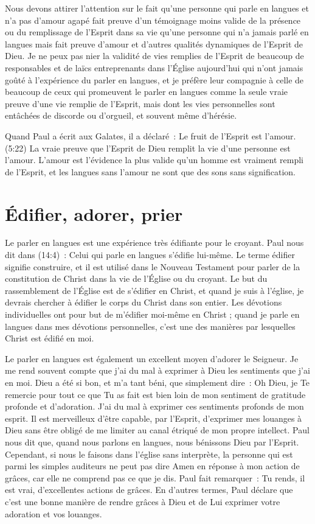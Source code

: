 Nous devons attirer l'attention sur le fait qu'une personne qui parle
 en langues et n'a pas d'amour agapé fait preuve d'un témoignage
 moins valide de la présence ou du remplissage de l'Esprit dans sa vie
 qu'une personne qui n'a jamais parlé en langues mais fait preuve d'amour
 et d'autres qualités dynamiques de l'Esprit de Dieu.
 Je ne peux pas nier la validité de vies remplies de l'Esprit de beaucoup
 de responsables et de laïcs entreprenants dans l'Église aujourd'hui
 qui n'ont jamais goûté à l'expérience du parler en langues,
 et je préfère leur compagnie à celle de beaucoup de ceux qui promeuvent
 le parler en langues comme la seule vraie preuve d'une vie remplie
 de l'Esprit, mais dont les vies personnelles sont entâchées de discorde
 ou d'orgueil, et souvent même d'hérésie.

Quand Paul a écrit aux Galates, il a déclaré~:
 \og Le fruit de l'Esprit est l'amour. \fg{}(5:22)
 La vraie preuve que l'Esprit de Dieu remplit la vie d'une personne
 est l'amour. L'amour est l'évidence la plus valide qu'un homme
 est vraiment rempli de l'Esprit, et les langues sans l'amour
 ne sont que des sons sans signification.


\section{\'Edifier, adorer, prier}

Le parler en langues est une expérience très édifiante pour le croyant.
 Paul nous dit dans (14:4)~:
 \og Celui qui parle en langues s'édifie lui-même. \fg{}
 Le terme \og édifier \fg{} signifie construire, et il est utilisé
 dans le Nouveau Testament pour parler de la constitution de Christ
 dans la vie de l'Église ou du croyant. Le but du rassemblement de l'Église
 est de s'édifier en Christ, et quand je suis à l'église,
 je devrais chercher à édifier le corps du Christ dans son entier.
 Les dévotions individuelles ont pour but de m'édifier moi-même en Christ ;
 quand je parle en langues dans mes dévotions personnelles,
 c'est une des manières par lesquelles Christ est édifié en moi.

Le parler en langues est également un excellent moyen d'adorer le Seigneur.
 Je me rend souvent compte que j'ai du mal à exprimer à Dieu les sentiments
 que j'ai en moi. Dieu a été si bon, et m'a tant béni, que simplement dire~:
 \og Oh Dieu, je Te remercie pour tout ce que Tu as fait \fg{}
 est bien loin de mon sentiment de gratitude profonde et d'adoration.
 J'ai du mal à exprimer ces sentiments profonds de mon esprit.
 Il est merveilleux d'être capable, par l'Esprit, d'exprimer mes louanges
 à Dieu sans être obligé de me limiter au canal étriqué
 de mon propre intellect. Paul nous dit que, quand nous parlons en langues,
 nous bénissons Dieu par l'Esprit. Cependant, si nous le faisons
 dans l'église sans interprète, la personne qui est parmi les simples auditeurs
 ne peut pas dire \og Amen \fg{} en réponse à mon action de grâces,
 car elle ne comprend pas ce que je dis. Paul fait remarquer~:
 \og Tu rends, il est vrai, d'excellentes actions de grâces. \fg{}
 En d'autres termes, Paul déclare que c'est une bonne manière
 de rendre grâces à Dieu et de Lui exprimer votre adoration et vos louanges.


